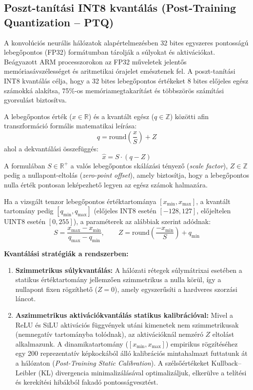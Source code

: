 \documentclass[12pt,a4paper,oneside]{report}
\begin{document}
\subsection{Poszt-tanítási INT8 kvantálás (Post-Training Quantization -- PTQ)}
A konvolúciós neurális hálózatok alapértelmezésben 32 bites egyszeres pontosságú lebegőpontos (FP32) formátumban tárolják a súlyokat és aktivációkat. Beágyazott ARM processzorokon az FP32 műveletek jelentős memóriasávszélességet és aritmetikai órajelet emésztenek fel. A poszt-tanítási INT8 kvantálás célja, hogy a 32 bites lebegőpontos értékeket 8 bites előjeles egész számokká alakítsa, 75\%-os memóriamegtakarítást és többszörös számítási gyorsulást biztosítva.

A lebegőpontos érték ($x \in \mathbb{R}$) és a kvantált egész ($q \in \mathbb{Z}$) közötti afin transzformáció formális matematikai leírása:
\begin{equation}
q = \text{round}\left(\frac{x}{S}\right) + Z
\end{equation}
ahol a dekvantálási összefüggés:
\begin{equation}
\hat{x} = S \cdot (q - Z)
\end{equation}
A formulában $S \in \mathbb{R}^+$ a valós lebegőpontos skálázási tényező (\textit{scale factor}), $Z \in \mathbb{Z}$ pedig a nullapont-eltolás (\textit{zero-point offset}), amely biztosítja, hogy a lebegőpontos nulla érték pontosan leképezhető legyen az egész számok halmazára.

Ha a vizsgált tenzor lebegőpontos értéktartománya $[x_{\min}, x_{\max}]$, a kvantált tartomány pedig $[q_{\min}, q_{\max}]$ (előjeles INT8 esetén $[-128, 127]$, előjeltelen UINT8 esetén $[0, 255]$), a paraméterek az alábbiak szerint adódnak:
\begin{equation}
S = \frac{x_{\max} - x_{\min}}{q_{\max} - q_{\min}}, \qquad Z = \text{round}\left(\frac{-x_{\min}}{S}\right) + q_{\min}
\end{equation}

\textbf{Kvantálási stratégiák a rendszerben:}
\begin{enumerate}
    \item \textbf{Szimmetrikus súlykvantálás:} A hálózati rétegek súlymátrixai esetében a statikus értéktartomány jellemzően szimmetrikus a nulla körül, így a nullapont fixen rögzíthető ($Z = 0$), amely egyszerűsíti a hardveres szorzási láncot.
    \item \textbf{Aszimmetrikus aktivációkvantálás statikus kalibrációval:} Mivel a ReLU és SiLU aktivációs függvények utáni kimenetek nem szimmetrikusak (nemnegatív tartományba tolódnak), az aktivációknál nemzéró $Z$ eltolást alkalmazunk. A dinamikatartomány ($[x_{\min}, x_{\max}]$) empirikus rögzítéséhez egy 200 reprezentatív képkockából álló kalibrációs mintahalmazt futtatunk át a hálózaton (\textit{Post-Training Static Calibration}). A szélsőértékeket Kullback--Leibler (KL) divergencia minimalizálásával optimalizáljuk, elkerülve a telítési és kerekítési hibákból fakadó pontosságvesztést.
\end{enumerate}
\end{document}
